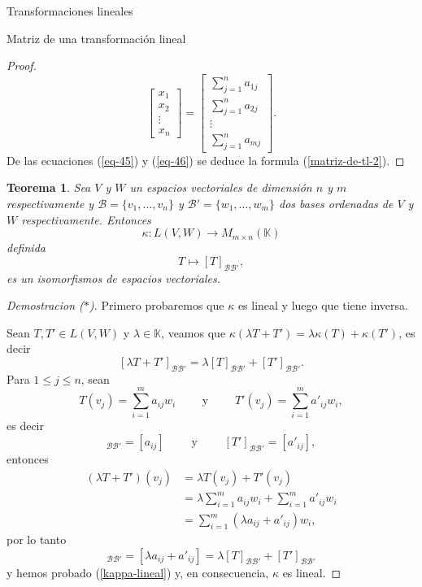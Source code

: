 \documentclass[a4paper,12pt,twoside,spanish,reqno]{amsbook}
\newtheorem{teorema}{Teorema}[section]
\theoremstyle{definition}
\theoremstyle{remark}
\newcommand{\K}{\mathbb K}
\begin{document}
\begin{chapter}{Transformaciones lineales}
\begin{section}{Matriz de una transformación lineal}
\begin{proof}
\begin{equation}
			\begin{bmatrix} x_1\\x_2\\ \vdots\\x_n\end{bmatrix}
			=
			\begin{bmatrix}  \sum_{j=1}^{n}a_{1j}\\\sum_{j=1}^{n}a_{2j}\\ \vdots\\\sum_{j=1}^{n}a_{mj}\end{bmatrix}.
			\end{equation}
			De las ecuaciones (\ref{eq-45}) y (\ref{eq-46}) se deduce la formula (\ref{matriz-de-tl-2}).
		\end{proof}
		
		\begin{teorema}
			Sea $V$  y $W$ un espacios vectoriales de dimensión $n$ y $m$ respectivamente y $\mathcal B = \{v_1,\ldots,v_n\}$ y $\mathcal B' = \{w_1,\ldots,w_m\}$ dos bases  ordenadas de $V$ y $W$ respectivamente. Entonces 
			$$
			\kappa: L(V,W) \to M_{m \times n}(\K)
			$$
			definida
			$$
			T \mapsto [T]_{\mathcal B \mathcal B'},
			$$
			es un isomorfismos de espacios vectoriales. 
		\end{teorema}
		\begin{proof}[Demostracion ($*$)]
			Primero probaremos que $\kappa$  es lineal y luego que tiene inversa.
			
			Sean $T,T' \in L(V,W)$ y $\lambda \in \K$, veamos que $\kappa(\lambda T+ T') = \lambda \kappa(T)+ \kappa(T')$,  es decir
			\begin{equation}\label{kappa-lineal}
				[\lambda T+ T']_{\mathcal B \mathcal B'} = \lambda[T]_{\mathcal B \mathcal B'}+ [T']_{\mathcal B \mathcal B'}.
			\end{equation}
			Para $1 \le j \le n$, sean 
			\begin{equation*}
				T(v_j) = \sum_{i=1}^m a_{ij} w_i\qquad \text{ y } \qquad T'(v_j) = \sum_{i=1}^m a'_{ij} w_i,
			\end{equation*}
			es  decir
			\begin{equation*}
			[T]_{\mathcal B \mathcal B'} =	[a_{ij}] \qquad\text{ y } \qquad [T']_{\mathcal B \mathcal B'} =	[a'_{ij}],
			\end{equation*}
			entonces
			\begin{align*}
				(\lambda T+ T')(v_j) &= \lambda T(v_j)+ T'(v_j) \\
				&=\lambda \sum_{i=1}^m a_{ij} w_i+ \sum_{i=1}^m a'_{ij} w_i \\
				&= \sum_{i=1}^m (\lambda a_{ij}+ a'_{ij}) w_i,
			\end{align*}
			por lo tanto
			\begin{equation*}
				[\lambda T+ T']_{\mathcal B \mathcal B'} = [\lambda a_{ij}+ a'_{ij}] =
				\lambda[T]_{\mathcal B \mathcal B'}+ [T']_{\mathcal B \mathcal B'}
			\end{equation*}
			y hemos probado (\ref{kappa-lineal}) y, en consecuencia, $\kappa$  es lineal.
			

\end{proof}
\end{section}
\end{chapter}
\end{document}
